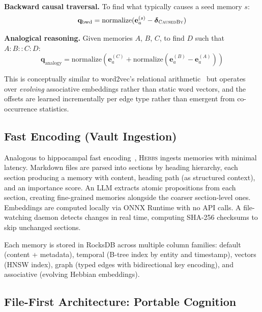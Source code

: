 \documentclass{article}
\begin{document}
\textbf{Backward causal traversal.} To find what typically causes a seed memory $s$:
\begin{equation}
    \mathbf{q}_{\text{bwd}} = \text{normalize}(\mathbf{e}_a^{(s)} - \boldsymbol{\delta}_{\textsc{CausedBy}})
\end{equation}

\textbf{Analogical reasoning.} Given memories $A$, $B$, $C$, to find $D$ such that $A{:}B{::}C{:}D$:
\begin{equation}
    \mathbf{q}_{\text{analogy}} = \text{normalize}\!\left(\mathbf{e}_a^{(C)} + \text{normalize}(\mathbf{e}_a^{(B)} - \mathbf{e}_a^{(A)})\right)
    \label{eq:analogy}
\end{equation}

This is conceptually similar to word2vec's relational arithmetic~\citep{mikolov2013} but operates over \emph{evolving} associative embeddings rather than static word vectors, and the offsets are learned incrementally per edge type rather than emergent from co-occurrence statistics.

\subsection{Fast Encoding (Vault Ingestion)}
\label{sec:vault}

Analogous to hippocampal fast encoding~\citep{mcclelland1995}, \textsc{Hebbs} ingests memories with minimal latency. Markdown files are parsed into sections by heading hierarchy, each section producing a memory with content, heading path (as structured context), and an importance score. An LLM extracts atomic propositions from each section, creating fine-grained memories alongside the coarser section-level ones. Embeddings are computed locally via ONNX Runtime with no API calls. A file-watching daemon detects changes in real time, computing SHA-256 checksums to skip unchanged sections.

Each memory is stored in RocksDB across multiple column families: default (content + metadata), temporal (B-tree index by entity and timestamp), vectors (HNSW index), graph (typed edges with bidirectional key encoding), and associative (evolving Hebbian embeddings).

\subsection{File-First Architecture: Portable Cognition}
\label{sec:filefirst}
\end{document}
